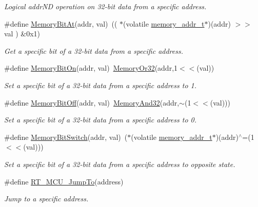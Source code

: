 \begin{DoxyCompactItemize}
\begin{DoxyCompactList}\small\item\em Logical addr\+ND operation on 32-\/bit data from a specific address. \end{DoxyCompactList}\item 
\#define \mbox{\hyperlink{a00020_afc530c7e6b49b0ca97c1ad9dac1c4750}{Memory\+Bit\+At}}(addr,  val)~(( $\ast$(volatile \mbox{\hyperlink{a00020_a06da901348542a481c297d9b700e2001}{memory\+\_\+addr\+\_\+t}}$\ast$)(addr) $>$$>$ val ) \&0x1)
\begin{DoxyCompactList}\small\item\em Get a specific bit of a 32-\/bit data from a specific address. \end{DoxyCompactList}\item 
\#define \mbox{\hyperlink{a00020_a99a602346038b54068758ef00c42d1b6}{Memory\+Bit\+On}}(addr,  val)~\mbox{\hyperlink{a00020_a27874a97deab7cecdde5ddecf466e31e}{Memory\+Or32}}(addr,1$<$$<$(val))
\begin{DoxyCompactList}\small\item\em Set a specific bit of a 32-\/bit data from a specific address to 1. \end{DoxyCompactList}\item 
\#define \mbox{\hyperlink{a00020_a04c34919a950117ae7da2dc5a235622b}{Memory\+Bit\+Off}}(addr,  val)~\mbox{\hyperlink{a00020_ad87cedffcaadc51db22594fce55173d4}{Memory\+And32}}(addr,$\sim$(1$<$$<$(val)))
\begin{DoxyCompactList}\small\item\em Set a specific bit of a 32-\/bit data from a specific address to 0. \end{DoxyCompactList}\item 
\#define \mbox{\hyperlink{a00020_ae49e41753dbce64185d380d307ade78d}{Memory\+Bit\+Switch}}(addr,  val)~($\ast$(volatile \mbox{\hyperlink{a00020_a06da901348542a481c297d9b700e2001}{memory\+\_\+addr\+\_\+t}}$\ast$)(addr)$^\wedge$=(1$<$$<$(val)))
\begin{DoxyCompactList}\small\item\em Set a specific bit of a 32-\/bit data from a specific address to opposite state. \end{DoxyCompactList}\item 
\#define \mbox{\hyperlink{a00020_a8c864ced65734e7f17f208d7b532c251}{R\+T\+\_\+\+M\+C\+U\+\_\+\+Jump\+To}}(address)
\begin{DoxyCompactList}\small\item\em Jump to a specific address. \end{DoxyCompactList}\item 

\end{DoxyCompactItemize}
